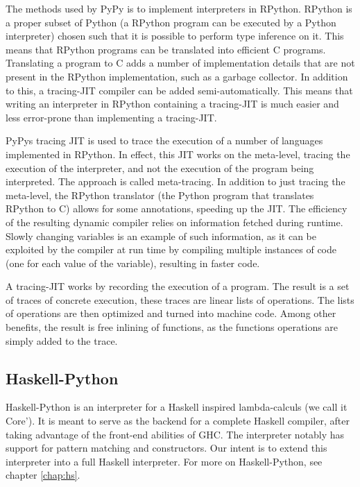 The methods used by PyPy is to implement interpreters in RPython. RPython is a proper 
subset of Python (a RPython program can be executed by a Python interpreter) 
chosen such that it is possible to perform type inference on it. This
means that RPython programs can be translated into efficient C programs. Translating a 
program to C adds a number of implementation details that are not present in the RPython
implementation, such as a garbage collector. In addition to this, a tracing-JIT compiler 
can be added semi-automatically. This means that writing an interpreter in RPython containing
a tracing-JIT is much easier and less error-prone than implementing a tracing-JIT. 
\cite{bolz2011runtime}

PyPys tracing JIT is used to trace the execution of a number of languages implemented 
in RPython. In effect,
this JIT works on the meta-level, tracing the execution of the interpreter, and not the 
execution of the program being interpreted. The approach is called meta-tracing. In addition
to just tracing the meta-level, the RPython translator (the Python program that translates
RPython to C) allows for some annotations, speeding up the JIT. The efficiency of the 
resulting dynamic compiler relies on information fetched during runtime. Slowly changing 
variables is an example of such information, as it can be exploited by the compiler at 
run time by compiling multiple instances of code (one for each value of the variable),
resulting in faster code. \cite{bolz2011runtime}

A tracing-JIT works by recording the execution of a program. The result is a set of 
traces of concrete execution, these traces are linear lists of operations. The lists of
operations are then optimized and turned into machine code. Among other benefits, the
result is free inlining of functions, as the functions operations are simply added to
the trace. \cite{bolz2011runtime}

\subsection{Haskell-Python}

Haskell-Python is an interpreter for a Haskell inspired lambda-calculs (we call it Core'). 
It is meant to serve as the backend for a complete Haskell compiler, after taking advantage 
of the front-end abilities of GHC. The interpreter notably has support for pattern matching 
and constructors. Our intent is to extend this interpreter into a full Haskell interpreter.
For more on Haskell-Python, see chapter \ref{chap:hs}.

